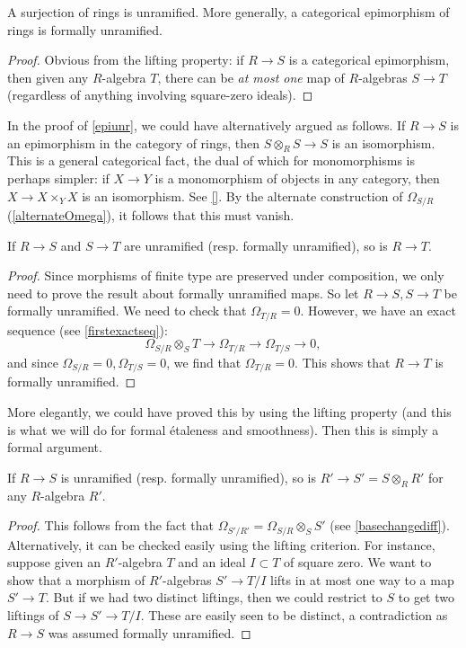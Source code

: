 \begin{proposition} \label{epiunr}
A surjection of rings is unramified.
More generally, a categorical epimorphism of rings is formally unramified.
\end{proposition} 
\begin{proof} 
Obvious from the lifting property: if $R \to S$ is a categorical epimorphism,
then given any $R$-algebra $T$, there can be \emph{at most one} map of
$R$-algebras $S \to T$ (regardless of anything involving square-zero ideals).
\end{proof} 

In the proof of \cref{epiunr}, we could have alternatively argued as follows. If $R \to S$ is an epimorphism
in the category of rings, then $S \otimes_R S \to S$ is an isomorphism. 
This is a general categorical fact, the dual of which for monomorphisms is
perhaps simpler: if $X \to Y$ is a monomorphism of objects in any category,
then $X \to X \times_Y X$ is an isomorphism. See \cref{}. By the alternate
construction of $\Omega_{S/R}$ (\cref{alternateOmega}), it follows that this must vanish.


\begin{proposition} 
\label{sorite1unr}
If $R \to S$ and $S \to T$ are unramified (resp. formally unramified), so is $R \to T$.
\end{proposition} 
\begin{proof} 
Since morphisms of finite type are preserved under composition, we only need
to prove the result about formally unramified maps. So let $R \to S, S \to T$
be formally unramified. We need to check that
$\Omega_{T/R}  = 0$. However, we have an exact sequence (see
\cref{firstexactseq}):
\[ \Omega_{S/R}\otimes_S T \to \Omega_{T/R} \to \Omega_{T/S} \to 0,  \]
and since $\Omega_{S/R} = 0, \Omega_{T/S} = 0$, we find that $\Omega_{T/R}  =
0$. This shows that $R \to T$ is formally unramified.
\end{proof} 
More elegantly, we could have proved this by using the lifting property (and
this is what we will do for formal \'etaleness and smoothness).
Then this is simply a formal argument.

\begin{proposition}  \label{unrbasechange}
If $R \to S$ is unramified (resp. formally unramified), so is $R' \to S' = S \otimes_R R'$ for any $R$-algebra
$R'$.
\end{proposition} 
\begin{proof} 
This follows from the fact that $\Omega_{S'/R'} = \Omega_{S/R} \otimes_S S'$
(see \cref{basechangediff}).
Alternatively, it can be checked easily using the lifting criterion.
For instance, suppose given an $R'$-algebra $T$ and an ideal $I \subset T$ of
square zero. We want to show that a morphism of $R'$-algebras
$S' \to T/I$ lifts in at most one way to a map $S' \to T$. But if we had two
distinct liftings, then we could restrict to $S$ to get two liftings  of $S \to
S' \to T/I$. These are easily seen to be distinct, a contradiction as $R \to
S$ was assumed formally unramified. 
\end{proof} 


